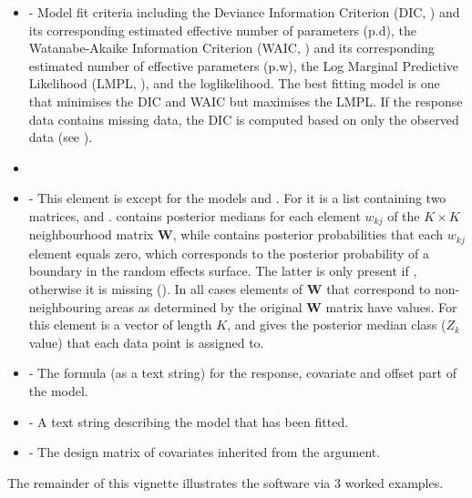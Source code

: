 \documentclass[article,shortnames,nojss]{jss}
\begin{document}
\begin{itemize}
\item {} - Model fit criteria including the Deviance Information Criterion (DIC, \cite{spiegelhalter2002}) and its corresponding estimated effective number of parameters (p.d), the Watanabe-Akaike Information Criterion (WAIC, \cite{watanabe2010}) and its corresponding estimated number of effective parameters (p.w), the Log Marginal Predictive Likelihood (LMPL, \cite{congdon2005}), and the loglikelihood. The best fitting model is one that minimises the DIC and WAIC but maximises the LMPL. If the response data contains missing data, the DIC is computed based on only the observed data (see \cite{celeux2006}).

\item {}

\item {} - This element is  except for the models  and . For  it is a list containing two matrices,  and .  contains posterior medians for each element $w_{kj}$ of the $K \times K$ neighbourhood matrix $\mathbf{W}$, while  contains posterior probabilities that each $w_{kj}$ element equals zero, which corresponds to the posterior probability of a boundary in the random effects surface. The latter is only present if , otherwise it is missing (). In all cases elements of $\mathbf{W}$ that correspond to non-neighbouring areas as determined by the original $\mathbf{W}$ matrix have  values.  For  this element is a vector of length $K$, and gives the posterior median class ($Z_{k}$ value) that each data point is assigned to.
        
\item {} - The formula (as a text string) for the response, covariate and offset part of the model.

\item {}- A text string describing the model that has been fitted.

\item {} - The design matrix of covariates inherited from the  argument.
\end{itemize}



The remainder of this vignette illustrates the  software via 3 worked examples.
\end{document}

